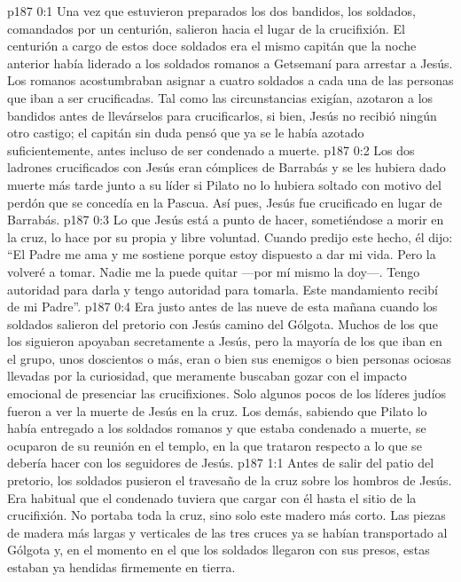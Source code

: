 \author{Comisión de seres intermedios}
\vs p187 0:1 Una vez que estuvieron preparados los dos bandidos, los soldados, comandados por un centurión, salieron hacia el lugar de la crucifixión. El centurión a cargo de estos doce soldados era el mismo capitán que la noche anterior había liderado a los soldados romanos a Getsemaní para arrestar a Jesús. Los romanos acostumbraban asignar a cuatro soldados a cada una de las personas que iban a ser crucificadas. Tal como las circunstancias exigían, azotaron a los bandidos antes de llevárselos para crucificarlos, si bien, Jesús no recibió ningún otro castigo; el capitán sin duda pensó que ya se le había azotado suficientemente, antes incluso de ser condenado a muerte.
\vs p187 0:2 Los dos ladrones crucificados con Jesús eran cómplices de Barrabás y se les hubiera dado muerte más tarde junto a su líder si Pilato no lo hubiera soltado con motivo del perdón que se concedía en la Pascua. Así pues, Jesús fue crucificado en lugar de Barrabás.
\vs p187 0:3 Lo que Jesús está a punto de hacer, sometiéndose a morir en la cruz, lo hace por su propia y libre voluntad. Cuando predijo este hecho, él dijo: “El Padre me ama y me sostiene porque estoy dispuesto a dar mi vida. Pero la volveré a tomar. Nadie me la puede quitar ---por mí mismo la doy---. Tengo autoridad para darla y tengo autoridad para tomarla. Este mandamiento recibí de mi Padre”.
\vs p187 0:4 Era justo antes de las nueve de esta mañana cuando los soldados salieron del pretorio con Jesús camino del Gólgota. Muchos de los que los siguieron apoyaban secretamente a Jesús, pero la mayoría de los que iban en el grupo, unos doscientos o más, eran o bien sus enemigos o bien personas ociosas llevadas por la curiosidad, que meramente buscaban gozar con el impacto emocional de presenciar las crucifixiones. Solo algunos pocos de los líderes judíos fueron a ver la muerte de Jesús en la cruz. Los demás, sabiendo que Pilato lo había entregado a los soldados romanos y que estaba condenado a muerte, se ocuparon de su reunión en el templo, en la que trataron respecto a lo que se debería hacer con los seguidores de Jesús.
\vs p187 1:1 Antes de salir del patio del pretorio, los soldados pusieron el travesaño de la cruz sobre los hombros de Jesús. Era habitual que el condenado tuviera que cargar con él hasta el sitio de la crucifixión. No portaba toda la cruz, sino solo este madero más corto. Las piezas de madera más largas y verticales de las tres cruces ya se habían transportado al Gólgota y, en el momento en el que los soldados llegaron con sus presos, estas estaban ya hendidas firmemente en tierra.
